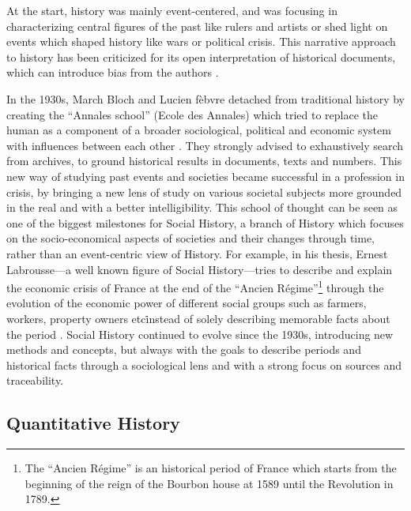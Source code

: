 At the start, history was mainly event-centered, and was focusing in characterizing central figures of the past like rulers and artists or shed light on events which shaped history like wars or political crisis.
This narrative approach to history has been criticized for its open interpretation of historical documents, which can introduce bias from the authors \cite{bourdieuRapportsEntreSociologie1995}.

In the 1930s, March Bloch and Lucien fèbvre detached from traditional history by creating the ``Annales school'' (Ecole des Annales) which tried to replace the human as a component of a broader sociological, political and economic system with influences between each other \cite{burkeHistorySocialTheory2005}.
They strongly advised to exhaustively search from archives, to ground historical results in documents, texts and numbers.
This new way of studying past events and societies became successful in a profession in crisis, by bringing a new lens of study on various societal subjects more grounded in the real and with a better intelligibility.
This school of thought can be seen as one of the biggest milestones for Social History, a branch of History which focuses on the socio-economical aspects of societies and their changes through time, rather than an event-centric view of History.
For example, in his thesis, Ernest Labrousse---a well known figure of Social History---tries to describe and explain the economic crisis of France at the end of the ``Ancien Régime''\footnote{The ``Ancien Régime'' is an historical period of France which starts from the beginning of the reign of the Bourbon house at 1589 until the Revolution in 1789.} through the evolution of the economic power of different social groups such as farmers, workers, property owners etc\. instead of solely describing memorable facts about the period \cite{labrousse1990crise}.
Social History continued to evolve since the 1930s, introducing new methods and concepts, but always with the goals to describe periods and historical facts through a sociological lens and with a strong focus on sources and traceability.



\subsection{Quantitative History}\label{subsec:quantitative-history}


